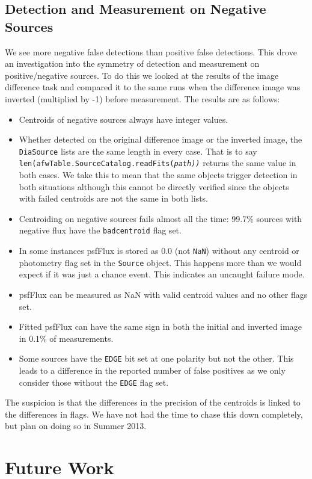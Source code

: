 \documentclass[prd, nofootinbib, floatfix, 11pt,tightenlines,times]{article}
\begin{document}
\subsection{Detection and Measurement on Negative Sources}
We see more negative false detections than positive false detections.  This drove an investigation 
into the symmetry of detection and measurement on positive/negative sources.  To do this we looked at the 
results of the image difference task and compared it to the same runs when the difference image was inverted
(multiplied by -1) before measurement.  The results are as follows:
\begin{itemize}
\item Centroids of negative sources always have integer values.
\item Whether detected on the original difference image or the inverted image, the {\tt DiaSource} lists are the same length in every
case.  That is to say {\tt len(afwTable.SourceCatalog.readFits(\it{path}))} returns the same value in both cases.  We take this to mean
that the same objects trigger detection in both situations although this cannot be directly verified since the objects with failed centroids are
not the same in both lists.  
\item Centroiding on negative sources fails almost all the time: 99.7\% sources with negative flux
have the {\tt badcentroid} flag set.
\item In some instances psfFlux is stored as 0.0 (not {\tt NaN}) without any centroid or photometry flag set in the {\tt Source} object.  This
happens more than we would expect if it was just a chance event.  This indicates an uncaught failure mode.
\item psfFlux can be measured as NaN with valid centroid values and no other flags set.
\item Fitted psfFlux can have the same sign in both the initial and inverted image in 0.1\% of measurements.
\item Some sources have the {\tt EDGE} bit set at one polarity but not the other.  
  This leads to a difference in the reported number of false positives as we only consider 
  those without the {\tt EDGE} flag set.
\end{itemize}

The suspicion is that the differences in the precision of the centroids is linked to the differences in flags.
We have not had the time to chase this down completely, but plan on doing so in Summer 2013.


\section{Future Work}
\end{document}
